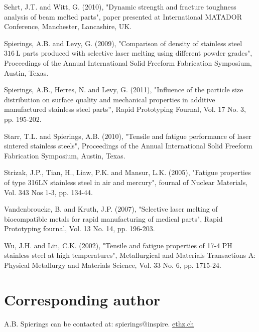 \documentclass[10pt]{article}
\begin{document}
Sehrt, J.T. and Witt, G. (2010), "Dynamic strength and fracture toughness analysis of beam melted parts", paper presented at International MATADOR Conference, Manchester, Lancashire, UK.

Spierings, A.B. and Levy, G. (2009), "Comparison of density of stainless steel $316 \mathrm{~L}$ parts produced with selective laser melting using different powder grades", Proceedings of the Annual International Solid Freeform Fabrication Symposium, Austin, Texas.

Spierings, A.B., Herres, N. and Levy, G. (2011), "Influence of the particle size distribution on surface quality and mechanical properties in additive manufactured stainless steel parts”, Rapid Prototyping Fournal, Vol. 17 No. 3, pp. 195-202.

Starr, T.L. and Spierings, A.B. (2010), "Tensile and fatigue performance of laser sintered stainless steels", Proceedings of the Annual International Solid Freeform Fabrication Symposium, Austin, Texas.

Strizak, J.P., Tian, H., Liaw, P.K. and Mansur, L.K. (2005), "Fatigue properties of type 316LN stainless steel in air and mercury", fournal of Nuclear Materials, Vol. 343 Nos 1-3, pp. 134-44.

Vandenbroucke, B. and Kruth, J.P. (2007), "Selective laser melting of biocompatible metals for rapid manufacturing of medical parts", Rapid Prototyping fournal, Vol. 13 No. 14, pp. 196-203.

Wu, J.H. and Lin, C.K. (2002), "Tensile and fatigue properties of 17-4 PH stainless steel at high temperatures", Metallurgical and Materials Transactions A: Physical Metallurgy and Materials Science, Vol. 33 No. 6, pp. 1715-24.

\section*{Corresponding author}
A.B. Spierings can be contacted at: spierings@inspire. \href{http://ethz.ch}{ethz.ch}
\end{document}
